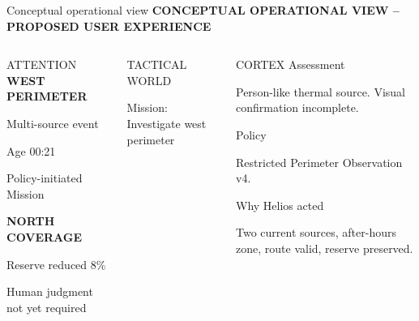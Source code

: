 \documentclass[aspectratio=169,10pt]{beamer}
\begin{document}
\begin{frame}{Conceptual operational view}
{\color{blue}\scriptsize\bfseries CONCEPTUAL OPERATIONAL VIEW -- PROPOSED USER EXPERIENCE}\vspace{2mm}
\begin{columns}[T]
\begin{block}{ATTENTION}
\scriptsize
{\color{amber}\bfseries WEST PERIMETER}\par Multi-source event\par Age 00:21\par Policy-initiated Mission\par\vspace{2mm}
{\color{red}\bfseries NORTH COVERAGE}\par Reserve reduced 8\%\par\vspace{2mm}
{\color{muted}Human judgment not yet required}
\end{block}
\begin{block}{TACTICAL WORLD}
\centering
{}
\par\scriptsize Mission: Investigate west perimeter
\end{block}
\begin{block}{CORTEX}
\scriptsize
Assessment\par Person-like thermal source. Visual confirmation incomplete.\vspace{2mm}\par
Policy\par Restricted Perimeter Observation v4.\vspace{2mm}\par
Why Helios acted\par Two current sources, after-hours zone, route valid, reserve preserved.

\end{block}
\end{columns}
\end{frame}
\end{document}
